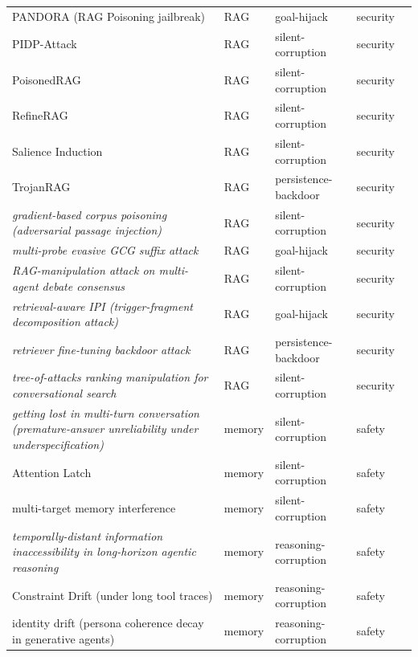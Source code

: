 \begin{longtable}{@{}p{}llll@{}}
PANDORA (RAG Poisoning jailbreak) & RAG & goal-hijack & security & \cite{deng-2024-pandora} \\
PIDP-Attack & RAG & silent-corruption & security & \cite{wang-2026-pidpattack} \\
PoisonedRAG & RAG & silent-corruption & security & \cite{zou-2024-poisonedrag} \\
RefineRAG & RAG & silent-corruption & security & \cite{wang-2026-refinerag} \\
Salience Induction & RAG & silent-corruption & security & \cite{zhou-2026-salience} \\
TrojanRAG & RAG & persistence-backdoor & security & \cite{cheng-2024-trojanrag} \\
\emph{gradient-based corpus poisoning (adversarial passage injection)} & RAG & silent-corruption & security & \cite{zhong-2023-poisoning} \\
\emph{multi-probe evasive GCG suffix attack} & RAG & goal-hijack & security & \cite{rahman-2026-bypassing} \\
\emph{RAG-manipulation attack on multi-agent debate consensus} & RAG & silent-corruption & security & \cite{kraidia-2026-raginduced} \\
\emph{retrieval-aware IPI (trigger-fragment decomposition attack)} & RAG & goal-hijack & security & \cite{chang-2026-overcoming} \\
\emph{retriever fine-tuning backdoor attack} & RAG & persistence-backdoor & security & \cite{clop-2024-backdoored} \\
\emph{tree-of-attacks ranking manipulation for conversational search} & RAG & silent-corruption & security & \cite{pfrommer-2024-ranking} \\
\emph{getting lost in multi-turn conversation (premature-answer unreliability under underspecification)} & memory & silent-corruption & safety & \cite{laban-2025-llms} \\
Attention Latch & memory & silent-corruption & safety & \cite{shehata-2026-attention} \\
multi-target memory interference & memory & silent-corruption & safety & \cite{lee-2026-minteval} \\
\emph{temporally-distant information inaccessibility in long-horizon agentic reasoning} & memory & reasoning-corruption & safety & \cite{hu-2026-sam} \\
Constraint Drift (under long tool traces) & memory & reasoning-corruption & safety & \cite{bui-2026-himaptravel} \\
identity drift (persona coherence decay in generative agents) & memory & reasoning-corruption & safety & \cite{platnick-2025-idrag} \\

\end{longtable}
